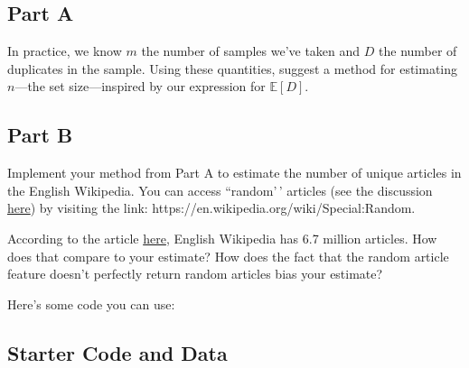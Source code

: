 \documentclass{article}
\begin{document}
\hypertarget{part-a}{%
\subsection*{Part A}\label{part-a}}

In practice, we know \(m\) the number of samples we've taken and \(D\) the number of duplicates in the sample. Using these quantities, suggest a method for estimating \(n\)---the set size---inspired by our expression for \(\mathbb{E}[D]\).

\hypertarget{part-b}{%
\subsection*{Part B}\label{part-b}}

Implement your method from Part A to estimate the number of unique articles in the English Wikipedia. You can access ``random'\,' articles (see the discussion \href{https://en.wikipedia.org/wiki/Wikipedia:FAQ/Technical\#random}{here}) by visiting the link: https://en.wikipedia.org/wiki/Special:Random.

According to the article \href{https://en.wikipedia.org/wiki/English_Wikipedia}{here}, English Wikipedia has 6.7 million articles. How does that compare to your estimate? How does the fact that the random article feature doesn't perfectly return random articles bias your estimate?

Here's some code you can use:

\subsection*{Starter Code and Data}

\end{document}
